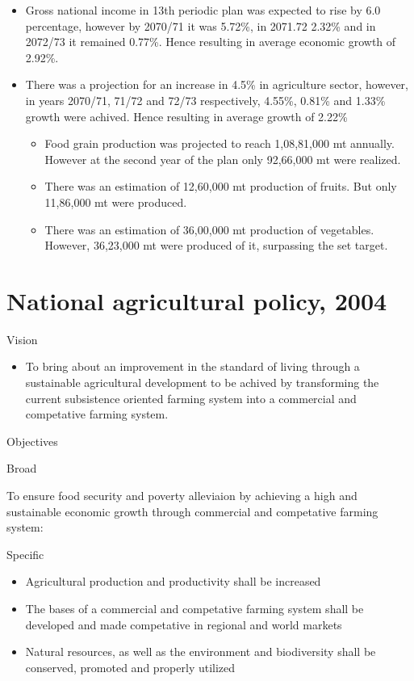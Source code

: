 \documentclass[
  openany]{book}
\providecommand{\tightlist}{%
  \setlength{\itemsep}{0pt}\setlength{\parskip}{0pt}}
\begin{document}
\begin{itemize}
\tightlist
\item
  Gross national income in 13th periodic plan was expected to rise by 6.0 percentage, however by 2070/71 it was 5.72\%, in 2071.72 2.32\% and in 2072/73 it remained 0.77\%. Hence resulting in average economic growth of 2.92\%.
\item
  There was a projection for an increase in 4.5\% in agriculture sector, however, in years 2070/71, 71/72 and 72/73 respectively, 4.55\%, 0.81\% and 1.33\% growth were achived. Hence resulting in average growth of 2.22\%

  \begin{itemize}
  \tightlist
  \item
    Food grain production was projected to reach 1,08,81,000 mt annually. However at the second year of the plan only 92,66,000 mt were realized.
  \item
    There was an estimation of 12,60,000 mt production of fruits. But only 11,86,000 mt were produced.
  \item
    There was an estimation of 36,00,000 mt production of vegetables. However, 36,23,000 mt were produced of it, surpassing the set target.
  \end{itemize}
\end{itemize}

\hypertarget{national-agricultural-policy-2004}{%
\section{National agricultural policy, 2004}\label{national-agricultural-policy-2004}}

Vision

\begin{itemize}
\tightlist
\item
  To bring about an improvement in the standard of living through a sustainable agricultural development to be achived by transforming the current subsistence oriented farming system into a commercial and competative farming system.
\end{itemize}

Objectives

Broad

To ensure food security and poverty alleviaion by achieving a high and sustainable economic growth through commercial and competative farming system:

Specific

\begin{itemize}
\tightlist
\item
  Agricultural production and productivity shall be increased
\item
  The bases of a commercial and competative farming system shall be developed and made competative in regional and world markets
\item
  Natural resources, as well as the environment and biodiversity shall be conserved, promoted and properly utilized
\end{itemize}
\end{document}
